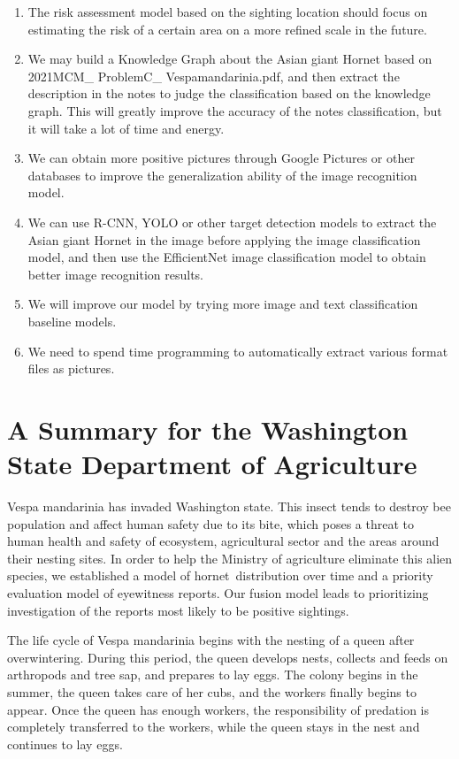 \documentclass{mcmthesis}
\numberwithin{figure}{section}
\numberwithin{table}{section}
\begin{document}
\begin{enumerate}
  \item The risk assessment model based on the sighting location should focus on estimating the risk of a certain area on a more refined scale in the future.
  \item We may build a Knowledge Graph about the Asian giant Hornet based on 2021MCM\_ ProblemC\_ Vespamandarinia.pdf, and then extract the description in the notes to judge the classification based on the knowledge graph. This will greatly improve the accuracy of the notes classification, but it will take a lot of time and energy.
  \item We can obtain more positive pictures through Google Pictures or other databases to improve the generalization ability of the image recognition model.
  \item We can use R-CNN, YOLO or other target detection models to extract the Asian giant Hornet in the image before applying the image classification model, and then use the EfficientNet image classification model to obtain better image recognition results.
  \item We will improve our model by trying more image and text classification baseline models.
  \item We need to spend time programming to automatically extract various format files as pictures.
\end{enumerate}






\newpage
\section{A Summary for the Washington State Department of Agriculture}


Vespa mandarinia has invaded Washington state. This insect tends to destroy bee population and affect human safety due to its bite, which poses a threat to human health and safety of ecosystem, agricultural sector and the areas around their nesting sites. In order to help the Ministry of agriculture eliminate this alien species, we established a model of hornet distribution over time and a priority evaluation model of eyewitness reports. Our fusion model  leads to prioritizing investigation of the reports most likely to be positive sightings.

The life cycle of Vespa mandarinia begins with the nesting of a queen after overwintering. During this period, the queen develops nests, collects and feeds on arthropods and tree sap, and prepares to lay eggs. The colony begins in the summer, the queen takes care of her cubs, and the workers finally begins to appear. Once the queen has enough workers, the responsibility of predation is completely transferred to the workers, while the queen stays in the nest and continues to lay eggs.
\end{document}
